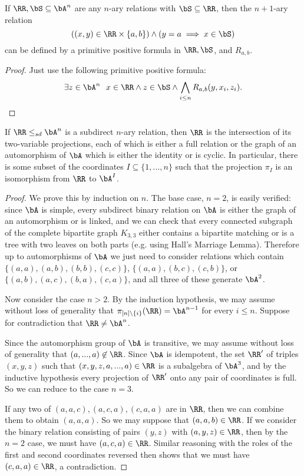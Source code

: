 \begin{prop} If $\RR, \bS \subseteq \bA^n$ are any $n$-ary relations with $\bS \subseteq \RR$, then the $n+1$-ary relation
\[
((x,y) \in \RR\times \{a,b\}) \wedge (y = a \implies x \in \bS)
\]
can be defined by a primitive positive formula in $\RR,\bS$, and $R_{a,b}$.
\end{prop}
\begin{proof} Just use the following primitive positive formula:
\[
\exists z \in \bA^n\ \ x \in \RR \wedge z \in \bS \wedge \bigwedge_{i \le n} R_{a,b}(y,x_i,z_i).\qedhere
\]
\end{proof}

\begin{prop}\label{rps-decompose} If $\RR \le_{sd} \bA^n$ is a subdirect $n$-ary relation, then $\RR$ is the intersection of its two-variable projections, each of which is either a full relation or the graph of an automorphism of $\bA$ which is either the identity or is cyclic. In particular, there is some subset of the coordinates $I \subseteq \{1, ..., n\}$ such that the projection $\pi_I$ is an isomorphism from $\RR$ to $\bA^I$.
\end{prop}
\begin{proof} We prove this by induction on $n$. The base case, $n = 2$, is easily verified: since $\bA$ is simple, every subdirect binary relation on $\bA$ is either the graph of an automorphism or is linked, and we can check that every connected subgraph of the complete bipartite graph $K_{3,3}$ either contains a bipartite matching or is a tree with two leaves on both parts (e.g. using Hall's Marriage Lemma). Therefore up to automorphisms of $\bA$ we just need to consider relations which contain $\{(a,a),(a,b),(b,b),(c,c)\}$, $\{(a,a),(b,c),(c,b)\}$, or $\{(a,b),(a,c),(b,a),(c,a)\}$, and all three of these generate $\bA^2$.

Now consider the case $n > 2$. By the induction hypothesis, we may assume without loss of generality that $\pi_{[n]\setminus \{i\}}(\RR) = \bA^{n-1}$ for every $i \le n$. Suppose for contradiction that $\RR \ne \bA^n$.

Since the automorphism group of $\bA$ is transitive, we may assume without loss of generality that $(a,...,a) \not\in \RR$. Since $\bA$ is idempotent, the set $\RR'$ of triples $(x,y,z)$ such that $(x,y,z,a,...,a) \in \RR$ is a subalgebra of $\bA^3$, and by the inductive hypothesis every projection of $\RR'$ onto any pair of coordinates is full. So we can reduce to the case $n = 3$.

If any two of $(a,a,c), (a,c,a), (c,a,a)$ are in $\RR$, then we can combine them to obtain $(a,a,a)$. So we may suppose that $(a,a,b) \in \RR$. If we consider the binary relation consisting of pairs $(y,z)$ with $(a,y,z) \in \RR$, then by the $n = 2$ case, we must have $(a,c,a) \in \RR$. Similar reasoning with the roles of the first and second coordinates reversed then shows that we must have $(c,a,a) \in \RR$, a contradiction.
\end{proof}

